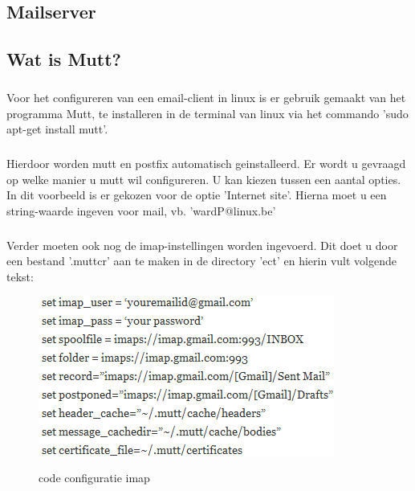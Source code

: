 \documentclass[12pt,a4paper]{report}
\begin{document}
\begin{flushleft}
\chapter{Mailserver}
\section{Wat is Mutt?}
\paragraph*{}
Voor het configureren van een email-client in linux is er gebruik gemaakt van het programma Mutt, te installeren in de terminal van linux via het commando 'sudo apt-get install mutt'.
\paragraph*{}
Hierdoor worden mutt en postfix automatisch geinstalleerd. Er wordt u gevraagd op welke manier u mutt wil configureren. U kan kiezen tussen een aantal opties. In dit voorbeeld is er gekozen voor de optie 'Internet site'. Hierna moet u een string-waarde ingeven voor mail, vb. 'wardP@linux.be'
\paragraph*{}
Verder moeten ook nog de imap-instellingen worden ingevoerd. Dit doet u door een bestand '.muttcr' aan te maken in de directory 'ect' en hierin vult volgende tekst:
\begin{figure}[H]
\includegraphics[scale=0.75]{images/imap_01.png}
\label{imap_01}
\centering 
\vspace{-10pt}
\caption{code configuratie imap}
\end{figure}  
\pagebreak

\end{flushleft}
\end{document}
